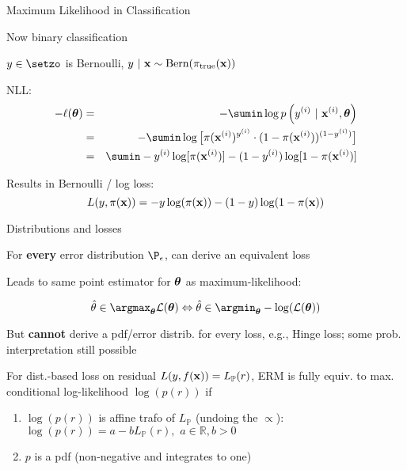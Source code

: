 \documentclass[11pt,compress,t,notes=noshow, xcolor=table]{beamer}
\begin{document}
\begin{framei}[sep=M]{Maximum Likelihood in Classification}

\item Now binary classification
\item $y \in \setzo$ is Bernoulli, $y ~|~ \mathbf{x} \sim \text{Bern}(\pi_\text{true}(\mathbf{x}))$
\item  NLL:
\begin{eqnarray*}
- \loglt &=& -\sumin \lpdfyigxit \\ 
&=& - \sumin \log \big[\pi(\xi)^{y^{(i)}} \cdot (1 - \pi(\xi))^{(1 - y^{(i)})} \big]\\
&=& \sumin -\yi \log[\pi(\xi)] - (1-\yi) \log [1 - \pi(\xi)]
\end{eqnarray*}
\item Results in Bernoulli / log loss:
$$
  L(y, \pi(\mathbf{x})) = -y\log(\pi(\mathbf{x}))-(1-y)\log(1-\pi(\mathbf{x}))
$$


\end{framei}




\begin{framei}[sep=L]{Distributions and losses}

\item For \textbf{every} error distribution $\P_\eps$, can derive an equivalent loss
\item Leads to same point estimator for $\bm{\theta}$ as maximum-likelihood:

$$
\thetah \in \argmax_{\thetav} \LL(\thetav) \Leftrightarrow \thetah \in \argmin_{\thetav}-\log(\LL(\thetav))
$$
    
\item But \textbf{cannot} derive a pdf/error distrib. for every loss, e.g., Hinge loss; some prob. interpretation still possible 

\item For dist.-based loss on residual $L(y,f(\mathbf{x}))=L_{\mathbb{P}}(r)$, ERM is fully equiv. to max. conditional log-likelihood $\log(p(r))$ if
\begin{enumerate}
    \item $\log(p(r))$ is affine trafo of $L_{\mathbb{P}}$ (undoing the $\propto$):
    $\log(p(r)) = a - bL_{\mathbb{P}}(r),\,\,a \in \mathbb{R}, b>0$
    \item  $p$ is a pdf (non-negative and integrates to one)
\end{enumerate}

\end{framei}


\endlecture
\end{document}
